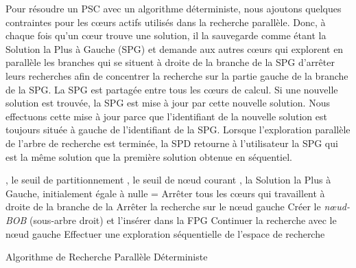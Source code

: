 \documentclass[parallelisme]{compas2014}
\begin{document}
Pour résoudre un PSC avec un algorithme déterministe, nous ajoutons quelques contraintes pour les cœurs actifs utilisés dans la recherche parallèle. Donc, à chaque fois qu'un cœur trouve une solution, il la sauvegarde comme étant la Solution la Plus à Gauche (SPG) et demande aux autres cœurs qui explorent en parallèle les branches qui se situent à droite de la branche de la SPG d'arrêter leurs recherches afin de concentrer la recherche sur la partie gauche de la branche de la SPG. La SPG est partagée entre tous les cœurs de calcul. Si une nouvelle solution est trouvée, la SPG est mise à jour par cette nouvelle solution. Nous effectuons cette mise à jour parce que l'identifiant de la nouvelle solution est toujours située à gauche de l'identifiant de la SPG. Lorsque l'exploration parallèle de l'arbre de recherche est terminée, la SPD retourne à l'utilisateur la SPG qui est la même solution que la première solution obtenue en séquentiel.

\begin{algorithm}[t]
\begin{algorithmic}
\REQUIRE , le seuil de partitionnement
\STATE , le seuil de nœud courant 
\STATE , la Solution la Plus à Gauche, initialement égale à nulle
        		\STATE =
	        \STATE Arrêter tous les cœurs qui travaillent à droite de la branche de la 
        \ENDIF
\ELSE
        \STATE Arrêter la recherche sur le nœud gauche
        \STATE Créer le \textit{nœud-BOB} (sous-arbre droit) et l'insérer dans la FPG
        \STATE Continuer la recherche avec le nœud gauche
	\ELSE
     	\STATE Effectuer une exploration séquentielle de l'espace de recherche
    \ENDIF
\ENDIF  
\end{algorithmic}
\caption{Algorithme de Recherche Parallèle Déterministe}
\label{Algo1}
\end{algorithm}
\end{document}

